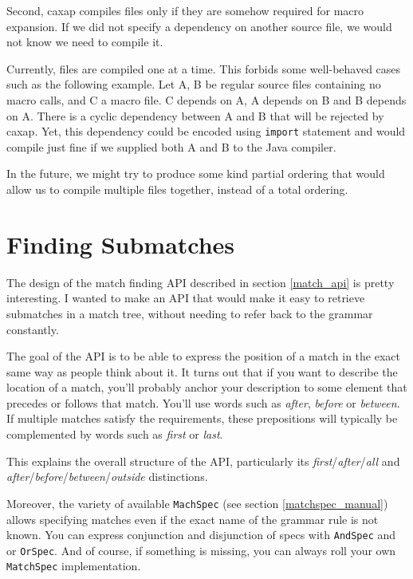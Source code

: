 Second, caxap compiles files only if they are somehow required for macro
expansion. If we did not specify a dependency on another source file, we would
not know we need to compile it.

Currently, files are compiled one at a time. This forbids some well-behaved
cases such as the following example. Let A, B be regular source files containing
no macro calls, and C a macro file. C depends on A, A depends on B and B depends
on A. There is a cyclic dependency between A and B that will be rejected by
caxap. Yet, this dependency could be encoded using \texttt{import} statement and
would compile just fine if we supplied both A and B to the Java compiler.

In the future, we might try to produce some kind partial ordering that would
allow us to compile multiple files together, instead of a total ordering.

\section{Finding Submatches}

The design of the match finding API described in section \ref{match_api} is
pretty interesting. I wanted to make an API that would make it easy to retrieve
submatches in a match tree, without needing to refer back to the grammar
constantly.

The goal of the API is to be able to express the position of a match in the
exact same way as people think about it. It turns out that if you want to
describe the location of a match, you'll probably anchor your description to
some element that precedes or follows that match. You'll use words such as
\emph{after}, \emph{before} or \emph{between}. If multiple matches satisfy the
requirements, these prepositions will typically be complemented by words such as
\emph{first} or \emph{last}.

This explains the overall structure of the API, particularly its
\emph{first}/\emph{after}/\emph{all} and
\emph{after}/\emph{before}/\emph{between}/\emph{outside} distinctions.

Moreover, the variety of available \texttt{MachSpec} (see section
\ref{matchspec_manual}) allows specifying matches even if the exact name of the
grammar rule is not known. You can express conjunction and disjunction of specs
with \texttt{AndSpec} and or \texttt{OrSpec}. And of course, if something is
missing, you can always roll your own \texttt{MatchSpec} implementation.

